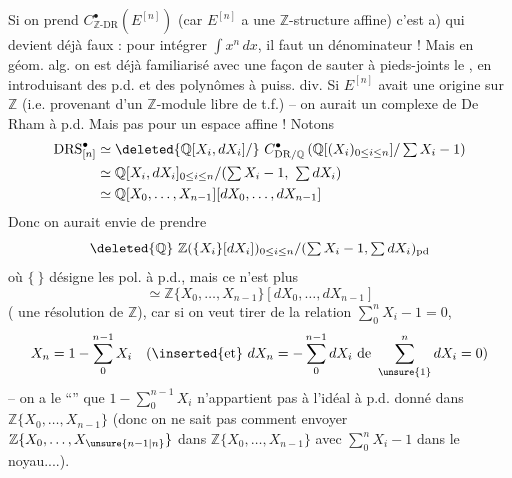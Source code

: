 Si on prend $C^\bullet_{\mathbb Z\text{-}\mathrm{DR}}(E^{[n]})$ (car $E^{[n]}$ a une $\mathbb Z$-structure affine) c'est a) qui devient déjà faux : pour intégrer $\int x^n\,dx$, il faut un dénominateur  ! Mais en géom. alg. on est déjà familiarisé avec une façon de sauter à pieds-joints   le , en introduisant des p.d. et des polynômes  à puiss. div. Si $E^{[n]}$ avait une origine sur $\mathbb Z$ (i.e. provenant  d'un $\mathbb Z$-module libre de t.f.) -- on aurait un complexe de De Rham à p.d. Mais pas pour un espace affine ! Notons
\[
\begin{aligned}
\mathrm{DRS}^\bullet_{[n]}&\simeq\deleted{\mathbb Q[X_i,dX_i]/}\ C^\bullet_{\mathrm{DR}/\mathbb Q}\left(\mathbb Q[(X_i)_{0\leq i\leq n}]/\textstyle\sum X_i-1\right)\\
&\simeq\mathbb Q[X_i,dX_i]_{0\leq i\leq n}/(\textstyle\sum X_i-1,\ \sum dX_i)\\
&\simeq\mathbb Q[X_0,\ldots,X_{n-1}][dX_0,\ldots,dX_{n-1}]
\end{aligned}
\]
Donc on aurait envie de prendre
\[
\deleted{\mathbb Q}\ \mathbb Z(\{X_i\}[dX_i])_{0\leq i\leq n}/(\textstyle\sum X_i-1,\sum dX_i)_{\mathrm{pd}}
\]
où $\{\ \}$ désigne les pol. à p.d., mais ce n'est plus
\[
\simeq\mathbb Z\{X_0,\ldots,X_{n-1}\}[dX_0,\ldots,dX_{n-1}]
\]
(   une résolution de $\mathbb Z$), car si on veut tirer de la relation $\sum_0^n X_i-1=0$,
\[
X_n=1-\sum_0^{n-1}X_i\quad
(\inserted{\text{et}}\ dX_n=-\sum_0^{n-1}dX_i\ \text{de }\sum_{\unsure{1}}^n dX_i=0)
\]
-- on a le ``'' que $1-\sum_0^{n-1}X_i$ n'appartient pas à l'idéal à p.d. donné dans $\mathbb Z\{X_0,\ldots,X_{n-1}\}$ (donc on ne sait pas comment envoyer $\mathbb Z\{X_0,\ldots,X_{\unsure{n-1|n}}\}$ dans $\mathbb Z\{X_0,\ldots,X_{n-1}\}$ avec   $\sum_0^n X_i-1$ dans le noyau....).

